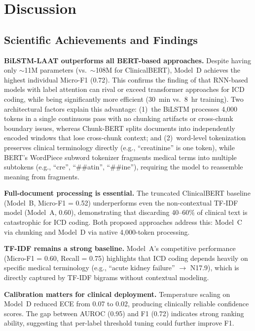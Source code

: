 \documentclass[11pt,a4paper]{article}
\begin{document}
\section{Discussion}

\subsection{Scientific Achievements and Findings}

\textbf{BiLSTM-LAAT outperforms all BERT-based approaches.}
Despite having only $\sim$11M parameters (vs.\ $\sim$108M for ClinicalBERT), Model~D achieves the highest individual Micro-F1 (0.72). This confirms the finding of \citet{vu2020label} that RNN-based models with label attention can rival or exceed transformer approaches for ICD coding, while being significantly more efficient (30~min vs.\ 8~hr training). Two architectural factors explain this advantage: (1)~the BiLSTM processes 4,000 tokens in a single continuous pass with no chunking artifacts or cross-chunk boundary issues, whereas Chunk-BERT splits documents into independently encoded windows that lose cross-chunk context; and (2)~word-level tokenization preserves clinical terminology directly (e.g., ``creatinine'' is one token), while BERT's WordPiece subword tokenizer fragments medical terms into multiple subtokens (e.g., ``cre'', ``\#\#atin'', ``\#\#ine''), requiring the model to reassemble meaning from fragments.

\textbf{Full-document processing is essential.}
The truncated ClinicalBERT baseline (Model~B, Micro-F1 = 0.52) underperforms even the non-contextual TF-IDF model (Model~A, 0.60), demonstrating that discarding 40--60\% of clinical text is catastrophic for ICD coding. Both proposed approaches address this: Model~C via chunking and Model~D via native 4,000-token processing.

\textbf{TF-IDF remains a strong baseline.}
Model~A's competitive performance (Micro-F1 = 0.60, Recall = 0.75) highlights that ICD coding depends heavily on specific medical terminology (e.g., ``acute kidney failure'' $\rightarrow$ N17.9), which is directly captured by TF-IDF bigrams without contextual modeling.

\textbf{Calibration matters for clinical deployment.}
Temperature scaling on Model~D reduced ECE from 0.07 to 0.02, producing clinically reliable confidence scores. The gap between AUROC (0.95) and F1 (0.72) indicates strong ranking ability, suggesting that per-label threshold tuning could further improve F1.
\end{document}
